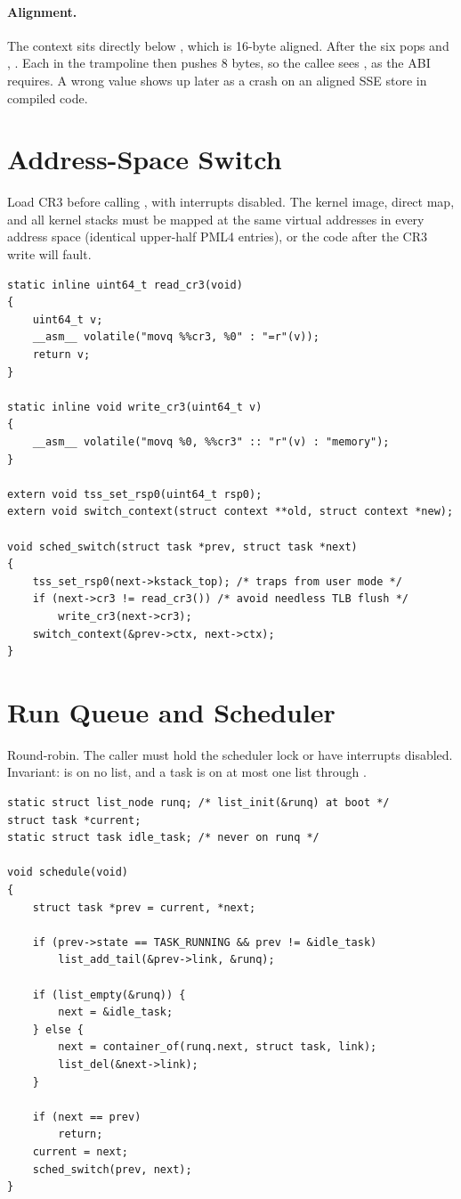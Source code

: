 \paragraph{Alignment.} The context sits directly below , which
is 16-byte aligned. After the six pops and , .
Each  in the trampoline then pushes 8 bytes, so the callee sees
, as the ABI requires. A wrong value shows up later
as a crash on an aligned SSE store in compiled code.

\section{Address-Space Switch}
Load CR3 before calling , with interrupts disabled.
The kernel image, direct map, and all kernel stacks must be mapped at the
same virtual addresses in every address space (identical upper-half PML4
entries), or the code after the CR3 write will fault.

\begin{lstlisting}[style=cstyle]
static inline uint64_t read_cr3(void)
{
    uint64_t v;
    __asm__ volatile("movq %%cr3, %0" : "=r"(v));
    return v;
}

static inline void write_cr3(uint64_t v)
{
    __asm__ volatile("movq %0, %%cr3" :: "r"(v) : "memory");
}

extern void tss_set_rsp0(uint64_t rsp0);
extern void switch_context(struct context **old, struct context *new);

void sched_switch(struct task *prev, struct task *next)
{
    tss_set_rsp0(next->kstack_top); /* traps from user mode */
    if (next->cr3 != read_cr3()) /* avoid needless TLB flush */
        write_cr3(next->cr3);
    switch_context(&prev->ctx, next->ctx);
}
\end{lstlisting}

\section{Run Queue and Scheduler}
Round-robin. The caller must hold the scheduler lock or have interrupts
disabled. Invariant:  is on no list, and a task is on at
most one list through .

\begin{lstlisting}[style=cstyle]
static struct list_node runq; /* list_init(&runq) at boot */
struct task *current;
static struct task idle_task; /* never on runq */

void schedule(void)
{
    struct task *prev = current, *next;

    if (prev->state == TASK_RUNNING && prev != &idle_task)
        list_add_tail(&prev->link, &runq);

    if (list_empty(&runq)) {
        next = &idle_task;
    } else {
        next = container_of(runq.next, struct task, link);
        list_del(&next->link);
    }

    if (next == prev)
        return;
    current = next;
    sched_switch(prev, next);
}
\end{lstlisting}

